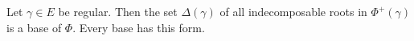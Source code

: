 Let $\gamma \in E$ be regular. Then the set $\Delta(\gamma)$ of all indecomposable
roots in $\Phi^+(\gamma)$ is a base of $\Phi$. Every base has this form.
